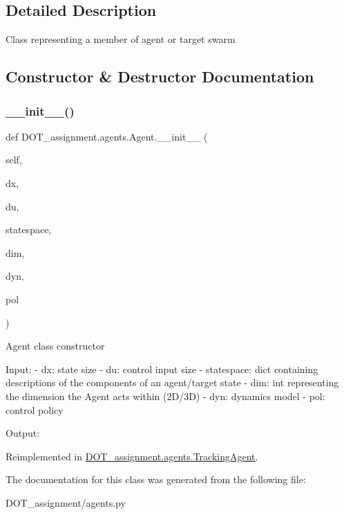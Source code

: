 \subsection{Detailed Description}
\begin{DoxyVerb}Class representing a member of agent or target swarm
\end{DoxyVerb}
 

\subsection{Constructor \& Destructor Documentation}
\mbox{\label{class_d_o_t__assignment_1_1agents_1_1_agent_a243feb66a55d2a2733464276db763fc3}} 
\subsubsection{\texorpdfstring{\_\_init\_\_()}{\_\_init\_\_()}}
{\footnotesize\ttfamily def D\+O\+T\+\_\+assignment.\+agents.\+Agent.\+\_\+\+\_\+init\+\_\+\+\_\+ (\begin{DoxyParamCaption}\item[{}]{self,  }\item[{}]{dx,  }\item[{}]{du,  }\item[{}]{statespace,  }\item[{}]{dim,  }\item[{}]{dyn,  }\item[{}]{pol }\end{DoxyParamCaption})}

\begin{DoxyVerb}Agent class constructor

Input:
- dx:                   state size
- du:                   control input size
- statespace:           dict containing descriptions of the components of an agent/target state
- dim:                  int representing the dimension the Agent acts within (2D/3D)
- dyn:                  dynamics model
- pol:                  control policy

Output:\end{DoxyVerb}
 

Reimplemented in \mbox{\hyperlink{class_d_o_t__assignment_1_1agents_1_1_tracking_agent_a8176e047211a3a386c4617f35fbf9d88}{D\+O\+T\+\_\+assignment.\+agents.\+Tracking\+Agent}}.



The documentation for this class was generated from the following file\+:\begin{DoxyCompactItemize}
\item 
D\+O\+T\+\_\+assignment/agents.\+py\end{DoxyCompactItemize}
